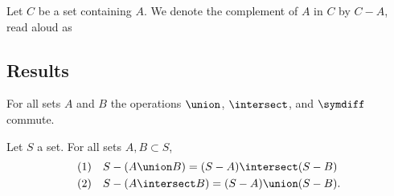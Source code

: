 Let $C$ be a set containing $A$.
We denote the complement of $A$ in $C$ by $C - A$, read aloud as 

\subsection{Results}

\begin{prop}
  For all sets $A$ and $B$ the operations $\union$, $\intersect$, and $\symdiff$ commute.
\end{prop}

\begin{prop}
  Let $S$ a set.
  For all sets $A, B \subset S$,
  \[
    \begin{aligned}
      \text{(1)} \quad & S - (A \union B) = (S - A) \intersect (S - B) \\
      \text{(2)} \quad & S - (A \intersect B) = (S - A) \union (S - B).
    \end{aligned}
  \]
\end{prop}


